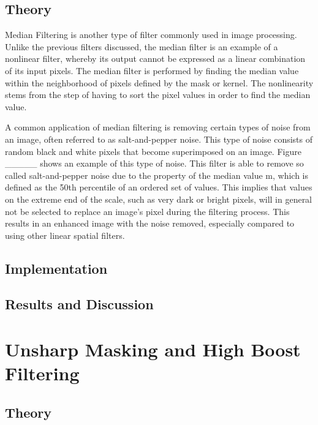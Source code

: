 \documentclass[headings=optiontoheadandtoc,listof=totoc,parskip=full]{scrartcl}
\begin{document}
\subsection{Theory}
\label{sec:median-theory}

Median Filtering is another type of filter commonly used in image processing. Unlike the previous filters discussed, the median filter is an example of a nonlinear filter, whereby its output cannot be expressed as a linear combination of its input pixels. The median filter is performed by finding the median value within the neighborhood of pixels defined by the mask or kernel. The nonlinearity stems from the step of having to sort the pixel values in order to find the median value. 

A common application of median filtering is removing certain types of noise from an image, often referred to as salt-and-pepper noise. This type of noise consists of random black and white pixels that become superimposed on an image. Figure _____ shows an example of this type of noise. This filter is able to remove so called salt-and-pepper noise due to the property of the median value m, which is defined as the 50th percentile of an ordered set of values. This implies that values on the extreme end of the scale, such as very dark or bright pixels, will in general not be selected to replace an image’s pixel during the filtering process. This results in an enhanced image with the noise removed, especially compared to using other linear spatial filters.



\subsection{Implementation}
\label{sec:median-implementation}


\subsection{Results and Discussion}
\label{sec:median-results}


\section{Unsharp Masking and High Boost Filtering}
\label{sec:unsharp}


\subsection{Theory}
\end{document}
